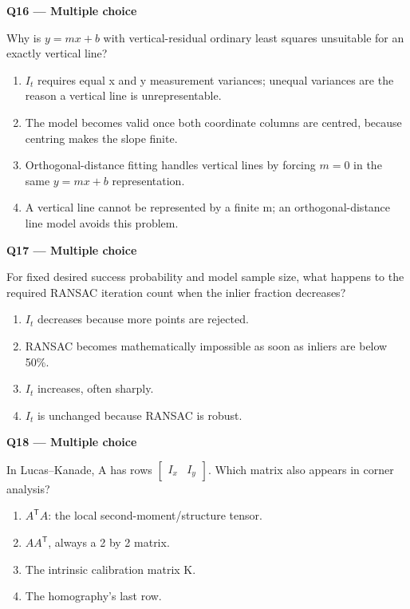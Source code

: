 \documentclass[11pt,a4paper]{article}
\begin{document}
\par\vspace{12pt}
\begin{minipage}{\linewidth}
\textbf{Q16 — Multiple choice}\par\smallskip
Why is \(y=mx+b\) with vertical-residual ordinary least squares unsuitable for an exactly vertical line?
\begin{enumerate}[label=\textbf{\Alph*.}]
\item \(I_t\) requires equal x and y measurement variances; unequal variances are the reason a vertical line is unrepresentable.
\item The model becomes valid once both coordinate columns are centred,\allowbreak{} because centring makes the slope finite.
\item Orthogonal-distance fitting handles vertical lines by forcing \(m=0\) in the same \(y=mx+b\) representation.
\item A vertical line cannot be represented by a finite m; an orthogonal-distance line model avoids this problem.
\end{enumerate}
\end{minipage}
\par\vspace{12pt}
\begin{minipage}{\linewidth}
\textbf{Q17 — Multiple choice}\par\smallskip
For fixed desired success probability and model sample size,\allowbreak{} what happens to the required RANSAC iteration count when the inlier fraction decreases?
\begin{enumerate}[label=\textbf{\Alph*.}]
\item \(I_t\) decreases because more points are rejected.
\item RANSAC becomes mathematically impossible as soon as inliers are below 50\%.
\item \(I_t\) increases,\allowbreak{} often sharply.
\item \(I_t\) is unchanged because RANSAC is robust.
\end{enumerate}
\end{minipage}
\par\vspace{12pt}
\begin{minipage}{\linewidth}
\textbf{Q18 — Multiple choice}\par\smallskip
In Lucas–Kanade,\allowbreak{} A has rows \(\begin{bmatrix}I_x&I_y\end{bmatrix}\). Which matrix also appears in corner analysis?
\begin{enumerate}[label=\textbf{\Alph*.}]
\item \(A^{\mathsf T}A\): the local second-moment/\allowbreak{}structure tensor.
\item \(AA^{\mathsf T}\),\allowbreak{} always a 2 by 2 matrix.
\item The intrinsic calibration matrix K.
\item The homography's last row.
\end{enumerate}
\end{minipage}
\end{document}

